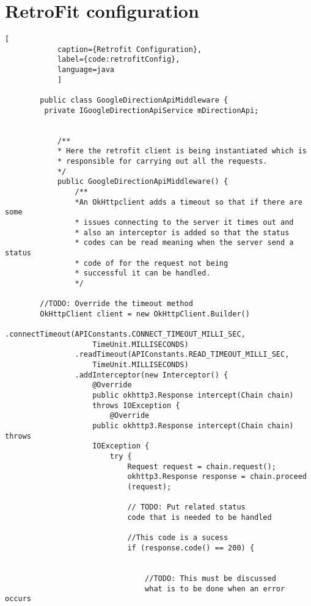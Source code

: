 \newpage
        \section{RetroFit configuration}
        \begin{lstlisting}[
            caption={Retrofit Configuration},
            label={code:retrofitConfig},
            language=java
            ]

        public class GoogleDirectionApiMiddleware {
         private IGoogleDirectionApiService mDirectionApi;


            /**
            * Here the retrofit client is being instantiated which is
            * responsible for carrying out all the requests.
            */
            public GoogleDirectionApiMiddleware() {
                /**
                *An OkHttpclient adds a timeout so that if there are some 
                * issues connecting to the server it times out and
                * also an interceptor is added so that the status 
                * codes can be read meaning when the server send a status 
                * code of for the request not being
                * successful it can be handled.
                */

        //TODO: Override the timeout method
        OkHttpClient client = new OkHttpClient.Builder()
                .connectTimeout(APIConstants.CONNECT_TIMEOUT_MILLI_SEC, 
                    TimeUnit.MILLISECONDS)
                .readTimeout(APIConstants.READ_TIMEOUT_MILLI_SEC, 
                    TimeUnit.MILLISECONDS)
                .addInterceptor(new Interceptor() {
                    @Override
                    public okhttp3.Response intercept(Chain chain) 
                    throws IOException {
                        @Override
                    public okhttp3.Response intercept(Chain chain) throws 
                    IOException {
                        try {
                            Request request = chain.request();
                            okhttp3.Response response = chain.proceed
                            (request);

                            // TODO: Put related status 
                            code that is needed to be handled

                            //This code is a sucess
                            if (response.code() == 200) {


                                //TODO: This must be discussed 
                                what is to be done when an error occurs


\end{lstlisting}
